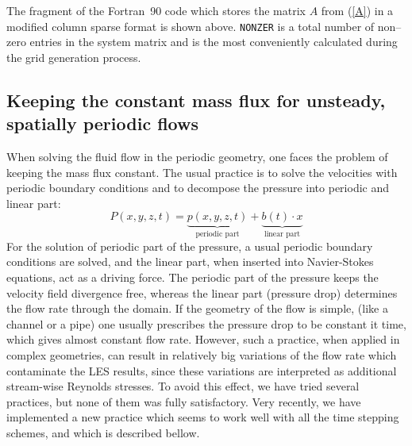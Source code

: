 \documentclass[10pt]{article}
\begin{document}
    \vspace{-0.2in}
    The fragment of the Fortran~90 code which stores the matrix
    $A$ from (\ref{A}) in a modified column sparse format is
    shown above. \texttt{NONZER} is a total number of non--zero
    entries in the system matrix and is the most conveniently
    calculated during the grid generation process.

    \subsection{Keeping the constant mass flux for 
                unsteady, spatially periodic flows}

    When solving the fluid flow in the periodic geometry, one
    faces the problem of keeping the mass flux constant. The
    usual practice is to solve the velocities with periodic
    boundary conditions and to decompose the pressure into
    periodic and linear part:
    \begin{equation}
    P(x,y,z,t) = \underbrace{p(x,y,z,t)}_{\mbox{periodic part}} 
               + \underbrace{b(t) \cdot x}_{\mbox{linear part}}
    \label{pressure}
    \end{equation}
    For the solution of periodic part of the pressure, a
    usual periodic boundary conditions are solved, and the
    linear part, when inserted into Navier-Stokes equations,
    act as a driving force. The periodic part of the 
    pressure keeps the velocity field divergence free,
    whereas the linear part (pressure drop) determines the flow rate through
    the domain. If the geometry of the flow is simple, (like
    a channel or a pipe) one usually prescribes the pressure
    drop to be constant it time, which gives almost 
    constant flow rate. However, such a practice, when 
    applied in complex geometries, can result in relatively
    big variations of the flow rate which contaminate the LES
    results, since these variations are interpreted as additional
    stream-wise Reynolds stresses. To avoid this effect, we have
    tried several practices, but none of them
    was fully satisfactory. Very recently, we have implemented
    a new practice which seems to work well with all the 
    time stepping schemes, and which is described bellow. 
\end{document}
